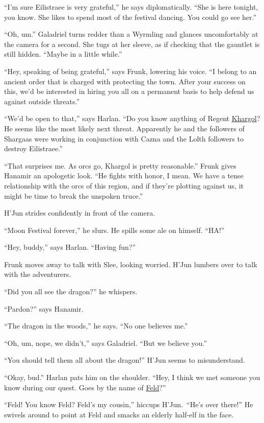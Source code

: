 \documentclass[smalldemyvopaper,11pt,twoside,onecolumn,openright,extrafontsizes]{memoir}
\begin{document}
``I'm sure Eilistraee is very grateful,'' he says diplomatically. ``She
is here tonight, you know. She likes to spend most of the festival
dancing. You could go see her.''

``Oh, um.'' Galadriel turns redder than a Wyrmling and glances
uncomfortably at the camera for a second. She tugs at her sleeve, as if
checking that the gauntlet is still hidden. ``Maybe in a little while.''

``Hey, speaking of being grateful,'' says Frunk, lowering his voice. ``I
belong to an ancient order that is charged with protecting the town.
After your success on this, we'd be interested in hiring you all on a
permanent basis to help defend us against outside threats.''

``We'd be open to that,'' says Harlan. ``Do you know anything of Regent
\href{/characters/khargol/}{Khargol}? He seems like the most likely next
threat. Apparently he and the followers of Shargaas were working in
conjunction with Cazna and the Lolth followers to destroy Eilistraee.''

``That surprises me. As orcs go, Khargol is pretty reasonable.'' Frunk
gives Hanamir an apologetic look. ``He fights with honor, I mean. We
have a tense relationship with the orcs of this region, and if they're
plotting against us, it might be time to break the unspoken truce.''

H'Jun strides confidently in front of the camera.

``Moon Festival forever,'' he slurs. He spills some ale on himself.
``HA!''

``Hey, buddy,'' says Harlan. ``Having fun?''

Frunk moves away to talk with Slee, looking worried. H'Jun lumbers over
to talk with the adventurers.

``Did you all see the dragon?'' he whispers.

``Pardon?'' says Hanamir.

``The dragon in the woods,'' he says. ``No one believes me.''

``Oh, um, nope, we didn't,'' says Galadriel. ``But we believe you.''

``You should tell them all about the dragon!'' H'Jun seems to
misunderstand.

``Okay, bud.'' Harlan pats him on the shoulder. ``Hey, I think we met
someone you know during our quest. Goes by the name of
\href{/characters/feld/}{Feld}?''

``Feld! You know Feld? Feld's my cousin,'' hiccups H'Jun.~``He's over
there!'' He swivels around to point at Feld and smacks an elderly
half-elf in the face.
\end{document}
